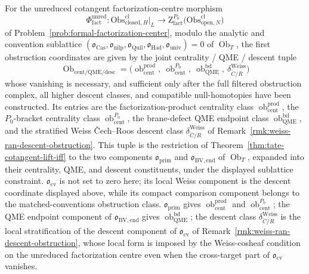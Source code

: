For the unreduced cotangent factorization-centre morphism
\[
  \Phi_{\mathrm{fact}}^{\mathrm{unred}}:
  \mathrm{Obs}^{\mathrm{cl}}_{\mathrm{closed},H}\big|_L
    \longrightarrow
  \mathrm Z^{P_0}_{\mathrm{fact}}
    \bigl(\mathrm{Obs}^{\mathrm{cl}}_{\mathrm{open},N}\bigr)
\]
of Problem~\ref{prob:formal-factorization-center}, modulo the
analytic and convention sublattice
\((\mathfrak o_{\mathrm{Cas}},
\mathfrak o_{\mathrm{nilp}},
\mathfrak o_{\mathrm{Quil}},
\mathfrak o_{\mathrm{Had}},
\mathfrak o_{\mathrm{univ}})=0\) of \(\operatorname{Ob}_T\), the first
obstruction coordinates are given by the joint centrality / QME / descent
tuple
\[
  \operatorname{Ob}_{\mathrm{cent/QME/desc}}
    =
    \bigl(
      \operatorname{ob}_{\mathrm{cent}}^{\mathrm{prod}},\
      \operatorname{ob}_{\mathrm{cent}}^{P_0},\
      \operatorname{ob}_{\mathrm{QME}}^{\mathrm{bd}},\
      \delta_{\check C/R}^{\mathrm{Weiss}}
    \bigr)
\]
whose vanishing is necessary, and sufficient only after the full
filtered obstruction complex, all higher descent classes, and
compatible null-homotopies have been constructed.  Its entries are the
factorization-product centrality class
\(\operatorname{ob}_{\mathrm{cent}}^{\mathrm{prod}}\), the
\(P_0\)-bracket centrality class
\(\operatorname{ob}_{\mathrm{cent}}^{P_0}\), the brane-defect QME
endpoint class \(\operatorname{ob}_{\mathrm{QME}}^{\mathrm{bd}}\), and
the stratified Weiss \v{C}ech--Roos descent class
\(\delta_{\check C/R}^{\mathrm{Weiss}}\) of
Remark~\ref{rmk:weiss-ran-descent-obstruction}.  This tuple is the
restriction of Theorem~\ref{thm:tate-cotangent-lift-iff} to the two components
\(\mathfrak o_{\mathrm{prim}}\) and \(\mathfrak o_{\mathrm{BV,end}}\)
of \(\operatorname{Ob}_T\), expanded into their centrality, QME, and
descent constituents, under the displayed sublattice constraint.
\(\mathfrak o_{\mathrm{cv}}\) is not set to zero here; its local Weiss
component is the descent coordinate displayed above, while its compact
comparison component belongs to the matched-conventions obstruction
class.
\(\mathfrak o_{\mathrm{prim}}\) gives
\(\operatorname{ob}_{\mathrm{cent}}^{\mathrm{prod}}\) and
\(\operatorname{ob}_{\mathrm{cent}}^{P_0}\); the QME endpoint
component of \(\mathfrak o_{\mathrm{BV,end}}\) gives
\(\operatorname{ob}_{\mathrm{QME}}^{\mathrm{bd}}\); the descent class
\(\delta_{\check C/R}^{\mathrm{Weiss}}\) is the local stratification
of the descent component of \(\mathfrak o_{\mathrm{cv}}\) of
Remark~\ref{rmk:weiss-ran-descent-obstruction}, whose local form is
imposed by the Weiss-cosheaf condition on the unreduced factorization
centre even when the cross-target part of \(\mathfrak o_{\mathrm{cv}}\)
vanishes.

